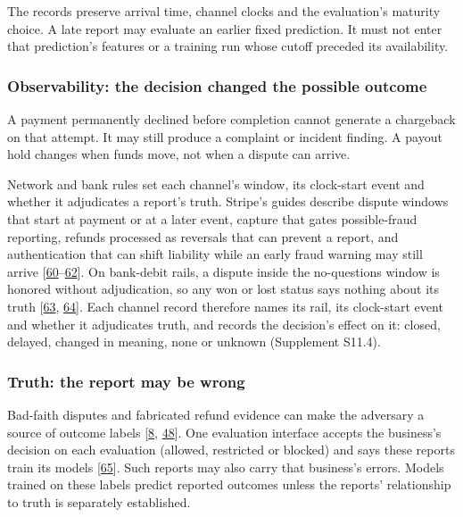 \documentclass[acmlarge,review,anonymous,nonacm]{acmart}
\begin{document}
The records preserve arrival time, channel clocks and the evaluation's
maturity choice. A late report may evaluate an earlier fixed prediction.
It must not enter that prediction's features or a training run whose
cutoff preceded its availability.

\hypertarget{observability-the-decision-changed-the-possible-outcome}{%
\subsubsection*{Observability: the decision changed the possible
outcome}\label{observability-the-decision-changed-the-possible-outcome}}

A payment permanently declined before completion cannot generate a
chargeback on that attempt. It may still produce a complaint or incident
finding. A payout hold changes when funds move, not when a dispute can
arrive.

Network and bank rules set each channel's window, its clock-start event
and whether it adjudicates a report's truth. Stripe's guides describe
dispute windows that start at payment or at a later event, capture that
gates possible-fraud reporting, refunds processed as reversals that can
prevent a report, and authentication that can shift liability while an
early fraud warning may still arrive
{[}\protect\hyperlink{ref-Stripe2026Disputes}{60}--\protect\hyperlink{ref-Stripe2026ThreeDS}{62}{]}.
On bank-debit rails, a dispute inside the no-questions window is honored
without adjudication, so any won or lost status says nothing about its
truth {[}\protect\hyperlink{ref-Stripe2026SEPADebit}{63},
\protect\hyperlink{ref-Stripe2026ACHTerms}{64}{]}. Each channel record
therefore names its rail, its clock-start event and whether it
adjudicates truth, and records the decision's effect on it: closed,
delayed, changed in meaning, none or unknown (Supplement S11.4).

\hypertarget{truth-the-report-may-be-wrong}{%
\subsubsection*{Truth: the report may be
wrong}\label{truth-the-report-may-be-wrong}}

Bad-faith disputes and fabricated refund evidence can make the adversary
a source of outcome labels
{[}\protect\hyperlink{ref-Dhama2026Causal}{8},
\protect\hyperlink{ref-Zhang2026Refund}{48}{]}. One evaluation interface
accepts the business's decision on each evaluation (allowed, restricted
or blocked) and says these reports train its models
{[}\protect\hyperlink{ref-Stripe2026CAE}{65}{]}. Such reports may also
carry that business's errors. Models trained on these labels predict
reported outcomes unless the reports' relationship to truth is
separately established.
\end{document}
